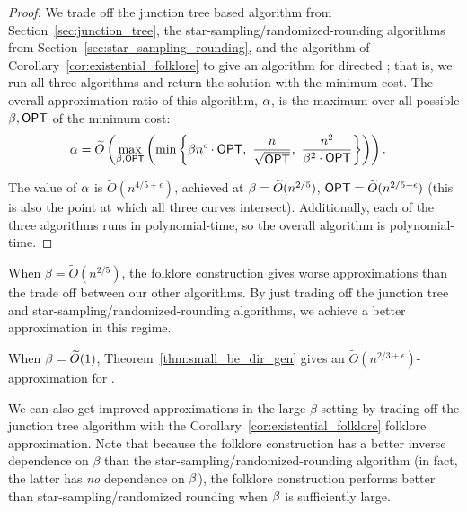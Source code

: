 \mainResult*

\begin{proof}
    We trade off the junction tree based algorithm from Section~\ref{sec:junction_tree}, the star-sampling/randomized-rounding algorithms from Section~\ref{sec:star_sampling_rounding}, and the algorithm of Corollary~\ref{cor:existential_folklore} to give an algorithm for directed {\hopset}; that is, we run all three algorithms and return the solution with the minimum cost. The overall approximation ratio of this algorithm, $\alpha$, is the maximum over all possible $\beta, {\sf OPT}$ of the minimum cost:
    \begin{align*}
        \alpha &= \widetilde{O}\left( \max_{\beta, {{\sf OPT}}} \left( \min_{} \left\{ \beta n^\epsilon \cdot {{\sf OPT}}, \mbox{ } \frac{n}{\sqrt{{{\sf OPT}}}}, \mbox{ }\frac{n^2}{\beta^2 \cdot {{\sf OPT}}}  \right\} \right) \right).                    
    \end{align*}
    
    The value of $\alpha$ is $\widetilde{O}(n^{4/5+\epsilon})$, achieved at $\beta = \widetilde{O}(n^{2/5})$, ${{\sf OPT}} = \widetilde{O}(n^{2/5 - \epsilon})$ (this is also the point at which all three curves intersect). Additionally, each of the three algorithms runs in polynomial-time, so the overall algorithm is polynomial-time.
\end{proof}



When $\beta = \widetilde{O}(n^{2/5})$, the folklore construction gives worse approximations than the trade off between our other algorithms. By just trading off the junction tree and star-sampling/randomized-rounding algorithms, we achieve a better approximation in this regime.

\smallBeDirGen*
\begin{corollary}
    When $\beta = \widetilde{O}(1)$, Theorem~\ref{thm:small_be_dir_gen} gives an $\widetilde{O}(n^{2/3 + \epsilon})$-approximation for {\hopset}.
\end{corollary}

We can also get improved approximations in the large $\beta$ setting by trading off the junction tree algorithm with the Corollary~\ref{cor:existential_folklore} folklore approximation. Note that because the folklore construction has a better inverse dependence on $\beta$ than the star-sampling/randomized-rounding algorithm (in fact, the latter has \textit{no} dependence on $\beta$), the folklore construction performs better than star-sampling/randomized rounding when $\beta$ is sufficiently large.

